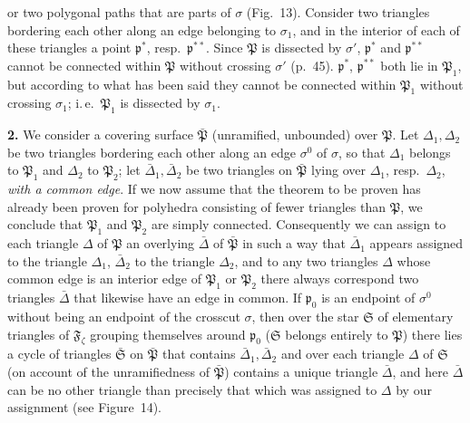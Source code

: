 \documentclass{article}
\begin{document}
or two polygonal paths that are parts of $\sigma$ (Fig.~13). Consider two triangles bordering each other along an edge belonging to $\sigma_1$, and in the interior of each of these triangles a point $\mathfrak{p}^*$, resp.\ $\mathfrak{p}^{**}$. Since $\mathfrak{P}$ is dissected by $\sigma'$, $\mathfrak{p}^*$ and $\mathfrak{p}^{**}$ cannot be connected within $\mathfrak{P}$ without crossing $\sigma'$ (p.~45). $\mathfrak{p}^*$, $\mathfrak{p}^{**}$ both lie in $\mathfrak{P}_1$, but according to what has been said they cannot be connected within $\mathfrak{P}_1$ without crossing $\sigma_1$; i.\,e.\ $\mathfrak{P}_1$ is dissected by $\sigma_1$.

\textbf{2.} We consider a covering surface $\bar{\mathfrak{P}}$ (unramified, unbounded) over $\mathfrak{P}$. Let $\Delta_1, \Delta_2$ be two triangles bordering each other along an edge $\sigma^0$ of $\sigma$, so that $\Delta_1$ belongs to $\mathfrak{P}_1$ and $\Delta_2$ to $\mathfrak{P}_2$; let $\bar{\Delta}_1, \bar{\Delta}_2$ be two triangles on $\bar{\mathfrak{P}}$ lying over $\Delta_1$, resp.\ $\Delta_2$, \emph{with a common edge}. If we now assume that the theorem to be proven has already been proven for polyhedra consisting of fewer triangles than $\mathfrak{P}$, we conclude that $\mathfrak{P}_1$ and $\mathfrak{P}_2$ are simply connected. Consequently we can assign to each triangle $\Delta$ of $\mathfrak{P}$ an overlying $\bar{\Delta}$ of $\bar{\mathfrak{P}}$ in such a way that $\bar{\Delta}_1$ appears assigned to the triangle $\Delta_1$, $\bar{\Delta}_2$ to the triangle $\Delta_2$, and to any two triangles $\Delta$ whose common edge is an interior edge of $\mathfrak{P}_1$ or $\mathfrak{P}_2$ there always correspond two triangles $\bar{\Delta}$ that likewise have an edge in common. If $\mathfrak{p}_0$ is an endpoint of $\sigma^0$ without being an endpoint of the crosscut $\sigma$, then over the star $\mathfrak{S}$ of elementary triangles of $\mathfrak{F}_\zeta$ grouping themselves around $\mathfrak{p}_0$ ($\mathfrak{S}$ belongs entirely to $\mathfrak{P}$) there lies a cycle of triangles $\bar{\mathfrak{S}}$ on $\bar{\mathfrak{P}}$ that contains $\bar{\Delta}_1, \bar{\Delta}_2$ and over each triangle $\Delta$ of $\mathfrak{S}$ (on account of the unramifiedness of $\bar{\mathfrak{P}}$) contains a unique triangle $\bar{\Delta}$, and here $\bar{\Delta}$ can be no other triangle than precisely that which was assigned to $\Delta$ by our assignment (see Figure~14).

\end{document}
